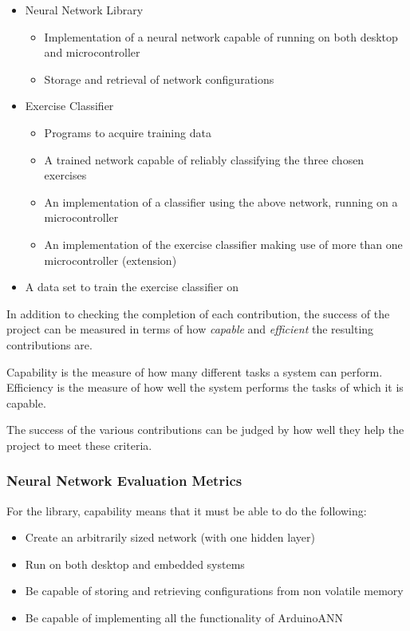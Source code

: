 \documentclass[a4paper]{article}
\begin{document}
\begin{itemize}
\item Neural Network Library 
  \begin{itemize}
  \item Implementation of a neural network capable of running on  both desktop and microcontroller
    \item Storage and retrieval of network configurations
  \end{itemize}
\item Exercise Classifier
  \begin{itemize}
  \item Programs to acquire training data
    \item A trained network capable of reliably classifying the three chosen exercises
    \item An implementation of a classifier using the above network, running on a microcontroller
    \item An implementation of the exercise classifier making use of more than one microcontroller (extension)
  \end{itemize}
\item A data set to train the exercise classifier on
\end{itemize}

In addition to checking the completion of each contribution, the success of the project can be measured in terms of how \textit{capable} and \textit{efficient} the resulting contributions are. 

Capability is the measure of how many different tasks a system can perform.
Efficiency is the measure of how well the system performs the tasks of which it is capable. 

The success of the various contributions can be judged by how well they help the project to meet these criteria.

\subsubsection{Neural Network Evaluation Metrics}

For the library, capability means that it must be able to do the following:

\begin{itemize}
\item Create an arbitrarily sized network (with one hidden layer)
\item Run on both desktop and embedded systems
\item Be capable of storing and retrieving configurations from non volatile memory
\item Be capable of implementing all the functionality of ArduinoANN
\end{itemize}
\end{document}
